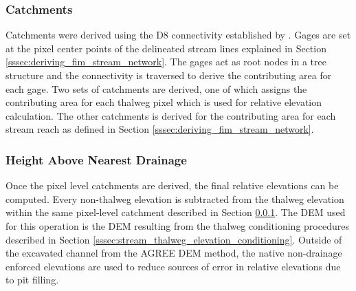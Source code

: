 \subsubsection{Catchments}
\label{sssec:catchments}
%
Catchments were derived using the D8 connectivity established by .
Gages are set at the pixel center points of the delineated stream lines explained in Section \ref{sssec:deriving_fim_stream_network}.
The gages act as root nodes in a tree structure and the connectivity is traversed to derive the contributing area for each gage.
Two sets of catchments are derived, one of which assigns the contributing area for each thalweg pixel which is used for relative elevation calculation.
The other catchments is derived for the contributing area for each stream reach as defined in Section \ref{sssec:deriving_fim_stream_network}. 
%
\subsubsection{Height Above Nearest Drainage}
%
Once the pixel level catchments are derived, the final relative elevations can be computed.
Every non-thalweg elevation is subtracted from the thalweg elevation within the same pixel-level catchment described in Section \ref{sssec:catchments}.
The DEM used for this operation is the DEM resulting from the thalweg conditioning procedures described in Section \ref{sssec:stream_thalweg_elevation_conditioning}.
Outside of the excavated channel from the AGREE DEM method, the native non-drainage enforced elevations are used to reduce sources of error in relative elevations due to pit filling. 
%
